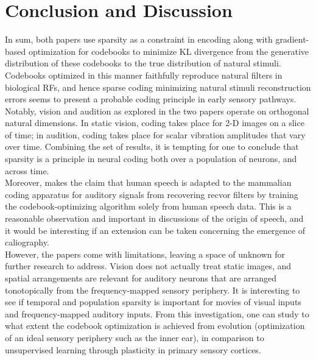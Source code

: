 \documentclass[
	a4paper, %
	11pt, %
	unnumberedsections, %
]{LTJournalArticle}
\begin{document}
\section{Conclusion and Discussion}
In sum, both papers use sparsity as a constraint in encoding along with gradient-based optimization for codebooks to minimize KL divergence from the generative distribution of these codebooks to the true distribution of natural stimuli. Codebooks optimized in this manner faithfully reproduce natural filters in biological RFs, and hence sparse coding minimizing natural stimuli reconstruction errors seems to present a probable coding principle in early sensory pathways. Notably, vision and audition as explored in the two papers operate on orthogonal natural dimensions. In static vision, coding takes place for 2-D images on a slice of time; in audition, coding takes place for scalar vibration amplitudes that vary over time. Combining the set of results, it is tempting for one to conclude that sparsity is a principle in neural coding both over a population of neurons, and across time. \\

Moreover, \textcite{smithEfficientAuditoryCoding2006} makes the claim that human speech is adapted to the mammalian coding apparatus for auditory signals from recovering recvor filters by training the codebook-optimizing algorithm solely from human speech data. This is a reasonable observation and important in discussions of the origin of speech, and it would be interesting if an extension can be taken concerning the emergence of caliography. \\

However, the papers come with limitations, leaving a space of unknown for further research to address. Vision does not actually treat static images, and spatial arrangements are relevant for auditory neurons that are arranged tonotopically from the frequency-mapped sensory periphery. It is interesting to see if temporal and population sparsity is important for movies of visual inputs and frequency-mapped auditory inputs. From this investigation, one can study to what extent the codebook optimization is achieved from evolution (optimization of an ideal sensory periphery such as the inner ear), in comparison to unsupervised learning through plasticity in primary sensory cortices. \\  
\end{document}
